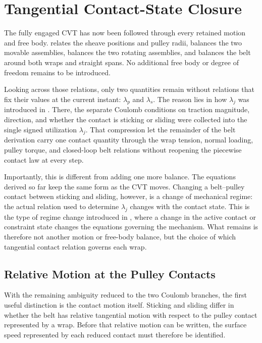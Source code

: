 \documentclass[11pt]{report}
\numberwithin{equation}{section}
\begin{document}
\section{Tangential Contact-State Closure}
\label{sec:engaged_dynamic_closure}

The fully engaged CVT has now been followed through every retained motion and
free body.  relates the sheave positions and pulley radii,
 balances the two movable assemblies,
 balances the two rotating assemblies,
and  balances the belt around both wraps and
straight spans. No additional free body or degree of freedom remains to be
introduced.

Looking across those relations, only two quantities remain without relations
that fix their values at the current instant: \(\lambda_p\) and
\(\lambda_s\). The reason lies in how \(\lambda_j\) was introduced in
. There, the separate Coulomb conditions on
traction magnitude, direction, and whether the contact is sticking or sliding
were collected into the single signed utilization \(\lambda_j\). That
compression let the remainder of the belt derivation carry one contact
quantity through the wrap tension, normal loading, pulley torque, and
closed-loop belt relations without reopening the piecewise contact law at
every step.

Importantly, this is different from adding one more balance. The equations
derived so far keep the same form as the CVT moves. Changing a belt--pulley
contact between sticking and sliding, however, is a change of mechanical
regime: the actual relation used to determine \(\lambda_j\) changes with the
contact state. This is the type of regime change introduced in
, where a change in the active
contact or constraint state changes the equations governing the mechanism.
What remains is therefore not another motion or free-body balance, but the 
choice of which tangential contact relation governs each wrap.

\subsection{Relative Motion at the Pulley Contacts}
\label{sec:tangential_contact_states}

With the remaining ambiguity reduced to the two Coulomb branches, the first
useful distinction is the contact motion itself. Sticking and sliding differ
in whether the belt has relative tangential motion with respect to the pulley
contact represented by a wrap. Before that relative motion can be written, the
surface speed represented by each reduced contact must therefore be identified.
\end{document}
